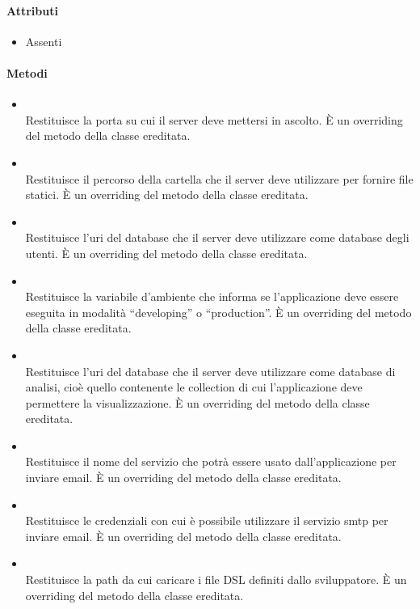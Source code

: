 \paragraph*{Attributi}
\begin{itemize}
\item[] Assenti
\end{itemize}

\paragraph*{Metodi}
\begin{itemize}
\item[]  \\ Restituisce la porta su cui il server deve mettersi in ascolto. È un overriding del metodo della classe ereditata.
\item[]  \\ Restituisce il percorso della cartella che il server deve utilizzare per fornire file statici. È un overriding del metodo della classe ereditata.

\item[]  \\ Restituisce l'uri del database che il server deve utilizzare come database degli utenti. È un overriding del metodo della classe ereditata.

\item[]  \\ Restituisce la variabile d'ambiente che informa se l'applicazione deve essere eseguita in modalità ``developing'' o ``production''. È un overriding del metodo della classe ereditata.

\item[]  \\ Restituisce l'uri del database che il server deve utilizzare come database di analisi, cioè quello contenente le collection di cui l'applicazione deve permettere la visualizzazione. È un overriding del metodo della classe ereditata.

\item[]  \\ Restituisce il nome del servizio che potrà essere usato dall'applicazione per inviare email. È un overriding del metodo della classe ereditata.

\item[]  \\ Restituisce le credenziali con cui è possibile utilizzare il servizio smtp per inviare email. È un overriding del metodo della classe ereditata.

\item[]  \\ Restituisce la path da cui caricare i file DSL definiti dallo sviluppatore. È un overriding del metodo della classe ereditata.

\end{itemize}